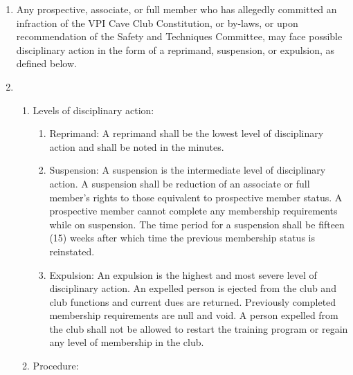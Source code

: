 \documentclass[
]{article}
\providecommand{\tightlist}{%
  \setlength{\itemsep}{0pt}\setlength{\parskip}{0pt}}
\begin{document}
\begin{enumerate}
\def\labelenumi{\arabic{enumi}.}
\item
  Any prospective, associate, or full member who has allegedly committed
  an infraction of the VPI Cave Club Constitution, or by-laws, or upon
  recommendation of the Safety and Techniques Committee, may face
  possible disciplinary action in the form of a reprimand, suspension,
  or expulsion, as defined below.
\item
  \begin{enumerate}
  \def\labelenumii{\Alph{enumii}.}
  \tightlist
  \item
    Levels of disciplinary action:

    \begin{enumerate}
    \def\labelenumiii{\roman{enumiii}.}
    \tightlist
    \item
      Reprimand: A reprimand shall be the lowest level of disciplinary
      action and shall be noted in the minutes.
    \item
      Suspension: A suspension is the intermediate level of disciplinary
      action. A suspension shall be reduction of an associate or full
      member's rights to those equivalent to prospective member status.
      A prospective member cannot complete any membership requirements
      while on suspension. The time period for a suspension shall be
      fifteen (15) weeks after which time the previous membership status
      is reinstated.
    \item
      Expulsion: An expulsion is the highest and most severe level of
      disciplinary action. An expelled person is ejected from the club
      and club functions and current dues are returned. Previously
      completed membership requirements are null and void. A person
      expelled from the club shall not be allowed to restart the
      training program or regain any level of membership in the club.
    \end{enumerate}
  \item
    Procedure:


\end{enumerate}
\end{enumerate}
\end{document}

